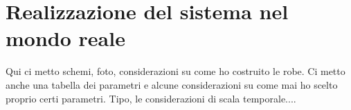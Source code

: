 \section{Realizzazione del sistema nel mondo reale}
\label{sec:sistema-reale}
Qui ci metto schemi, foto, considerazioni su come ho costruito le robe. Ci metto anche una tabella dei parametri e alcune considerazioni su come mai ho scelto proprio certi parametri. Tipo, le considerazioni di scala temporale....
